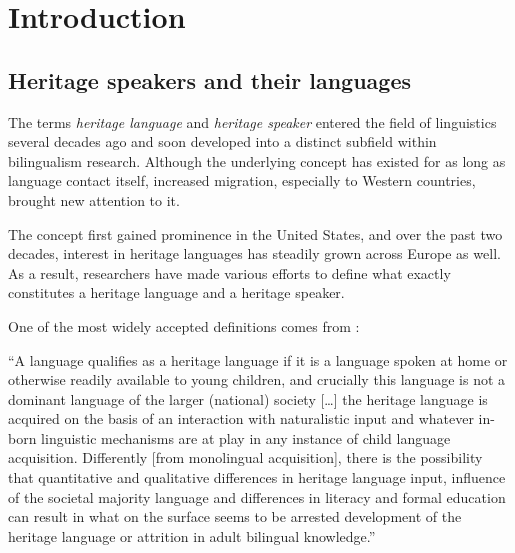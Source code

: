\chapter{Introduction}\label{chap:key:1}
\section{Heritage speakers and their languages}\label{sec:key:1.1}

The terms \textit{heritage language} and \textit{heritage speaker} entered the field of linguistics several decades ago and soon developed into a distinct subfield within bilingualism research. Although the underlying concept has existed for as long as language contact itself, increased migration, especially to Western countries, brought new attention to it.

The concept first gained prominence in the United States, and over the past two decades, interest in heritage languages has steadily grown across Europe as well. As a result, researchers have made various efforts to define what exactly constitutes a heritage language and a heritage speaker.

One of the most widely accepted definitions comes from \citet[156]{Rothman2009}:

 “A language qualifies as a heritage language if it is a language spoken at home or otherwise readily available to young children, and crucially this language is not a dominant language of the larger (national) society […] the heritage language is acquired on the basis of an interaction with naturalistic input and whatever in-born linguistic mechanisms are at play in any instance of child language acquisition. Differently [from monolingual acquisition], there is the possibility that quantitative and qualitative differences in heritage language input, influence of the societal majority language and differences in literacy and formal education can result in what on the surface seems to be arrested development of the heritage language or attrition in adult bilingual knowledge.”

